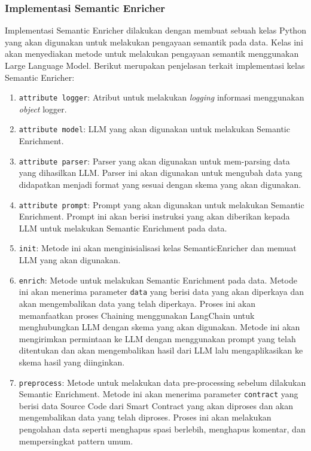 \subsubsection{Implementasi Semantic Enricher}

Implementasi Semantic Enricher dilakukan dengan membuat sebuah kelas Python yang akan digunakan untuk melakukan pengayaan semantik pada data. Kelas ini akan menyediakan metode untuk melakukan pengayaan semantik menggunakan Large Language Model. Berikut merupakan penjelasan terkait implementasi kelas Semantic Enricher:

\begin{enumerate}
	\item \texttt{attribute logger}: Atribut untuk melakukan \textit{logging} informasi menggunakan \textit{object} logger.
	\item \texttt{attribute model}: LLM yang akan digunakan untuk melakukan Semantic Enrichment.
	\item \texttt{attribute parser}: Parser yang akan digunakan untuk mem-parsing data yang dihasilkan LLM. Parser ini akan digunakan untuk mengubah data yang didapatkan menjadi format yang sesuai dengan skema yang akan digunakan.
	\item \texttt{attribute prompt}: Prompt yang akan digunakan untuk melakukan Semantic Enrichment. Prompt ini akan berisi instruksi yang akan diberikan kepada LLM untuk melakukan Semantic Enrichment pada data.
	\item \texttt{\textunderscore\textunderscore init\textunderscore\textunderscore}: Metode ini akan menginisialisasi kelas SemanticEnricher dan memuat LLM yang akan digunakan.
	\item \texttt{enrich}: Metode untuk melakukan Semantic Enrichment pada data. Metode ini akan menerima parameter \texttt{data} yang berisi data yang akan diperkaya dan akan mengembalikan data yang telah diperkaya. Proses ini akan memanfaatkan proses Chaining menggunakan LangChain untuk menghubungkan LLM dengan skema yang akan digunakan. Metode ini akan mengirimkan permintaan ke LLM dengan menggunakan prompt yang telah ditentukan dan akan mengembalikan hasil dari LLM lalu mengaplikasikan ke skema hasil yang diinginkan.
	\item \texttt{preprocess}: Metode untuk melakukan data pre-processing sebelum dilakukan Semantic Enrichment. Metode ini akan menerima parameter \texttt{contract} yang berisi data Source Code dari Smart Contract yang akan diproses dan akan mengembalikan data yang telah diproses. Proses ini akan melakukan pengolahan data seperti menghapus spasi berlebih, menghapus komentar, dan mempersingkat pattern umum.
\end{enumerate}

